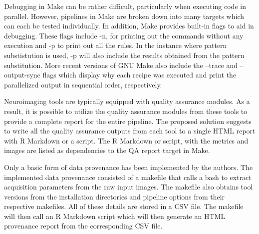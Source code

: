 \documentclass{report}
\begin{document}
    Debugging in Make can be rather difficult, particularly when executing code
    in parallel. However, pipelines in Make are broken down into many targets
    which can each be tested individually. In addition, Make provides built-in
    flags to aid in debugging. These flags include -n, for printing out the
    commands without any execution and -p to print out all the rules. In the
    instance where pattern substistution is used, -p will also include the
    results obtained from the pattern substitution. More recent versions of GNU
    Make also include the --trace and --output-sync flags which display why each
    recipe was executed and print the parallelized output in sequential order,
    respectively.


    Neuroimaging tools are typically equipped with quality assurance modules. As
    a result, it is possible to utilize the quality assurance modules from these
    tools to provide a complete report for the entire pipeline. The proposed
    solution suggests to write all the quality assurance outputs from each tool
    to a single HTML report with R Markdown or a script. The R Markdown or
    script, with the metrics and images are listed as dependencies to the QA
    report target in Make.


    Only a basic form of data provenance has been implemented by the authors.
    The implemented data provenance consisted of a makefile that calls a bash to
    extract acquisition parameters from the raw input images. The makefile also
    obtains tool versions from the installation directories and pipeline options
    from their respective makefiles. All of these details are stored in a CSV
    file.  The makefile will then call an R Markdown script which will then
    generate an HTML provenance report from the corresponding CSV file.
         
\end{document}
